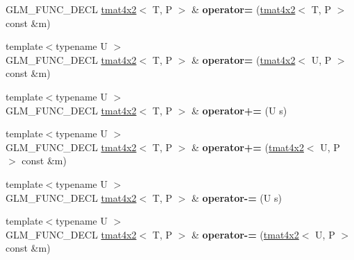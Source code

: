 \begin{DoxyCompactItemize}
\item 
G\+L\+M\+\_\+\+F\+U\+N\+C\+\_\+\+D\+E\+CL \hyperlink{structglm_1_1detail_1_1tmat4x2}{tmat4x2}$<$ T, P $>$ \& {\bfseries operator=} (\hyperlink{structglm_1_1detail_1_1tmat4x2}{tmat4x2}$<$ T, P $>$ const \&m)\hypertarget{structglm_1_1detail_1_1tmat4x2_a540bb35dcfe3e71b82c4abccca943cd2}{}\label{structglm_1_1detail_1_1tmat4x2_a540bb35dcfe3e71b82c4abccca943cd2}

\item 
{\footnotesize template$<$typename U $>$ }\\G\+L\+M\+\_\+\+F\+U\+N\+C\+\_\+\+D\+E\+CL \hyperlink{structglm_1_1detail_1_1tmat4x2}{tmat4x2}$<$ T, P $>$ \& {\bfseries operator=} (\hyperlink{structglm_1_1detail_1_1tmat4x2}{tmat4x2}$<$ U, P $>$ const \&m)\hypertarget{structglm_1_1detail_1_1tmat4x2_a520ecb4fc8ff7b87e517db74d07678a7}{}\label{structglm_1_1detail_1_1tmat4x2_a520ecb4fc8ff7b87e517db74d07678a7}

\item 
{\footnotesize template$<$typename U $>$ }\\G\+L\+M\+\_\+\+F\+U\+N\+C\+\_\+\+D\+E\+CL \hyperlink{structglm_1_1detail_1_1tmat4x2}{tmat4x2}$<$ T, P $>$ \& {\bfseries operator+=} (U s)\hypertarget{structglm_1_1detail_1_1tmat4x2_afc1384cd2981f135bf21be4f2405298d}{}\label{structglm_1_1detail_1_1tmat4x2_afc1384cd2981f135bf21be4f2405298d}

\item 
{\footnotesize template$<$typename U $>$ }\\G\+L\+M\+\_\+\+F\+U\+N\+C\+\_\+\+D\+E\+CL \hyperlink{structglm_1_1detail_1_1tmat4x2}{tmat4x2}$<$ T, P $>$ \& {\bfseries operator+=} (\hyperlink{structglm_1_1detail_1_1tmat4x2}{tmat4x2}$<$ U, P $>$ const \&m)\hypertarget{structglm_1_1detail_1_1tmat4x2_a65939b2c728dde98658056e9f1e68b2a}{}\label{structglm_1_1detail_1_1tmat4x2_a65939b2c728dde98658056e9f1e68b2a}

\item 
{\footnotesize template$<$typename U $>$ }\\G\+L\+M\+\_\+\+F\+U\+N\+C\+\_\+\+D\+E\+CL \hyperlink{structglm_1_1detail_1_1tmat4x2}{tmat4x2}$<$ T, P $>$ \& {\bfseries operator-\/=} (U s)\hypertarget{structglm_1_1detail_1_1tmat4x2_aa29ebe7a63b94a6313746b46e249bbab}{}\label{structglm_1_1detail_1_1tmat4x2_aa29ebe7a63b94a6313746b46e249bbab}

\item 
{\footnotesize template$<$typename U $>$ }\\G\+L\+M\+\_\+\+F\+U\+N\+C\+\_\+\+D\+E\+CL \hyperlink{structglm_1_1detail_1_1tmat4x2}{tmat4x2}$<$ T, P $>$ \& {\bfseries operator-\/=} (\hyperlink{structglm_1_1detail_1_1tmat4x2}{tmat4x2}$<$ U, P $>$ const \&m)\hypertarget{structglm_1_1detail_1_1tmat4x2_a1090317fd177133e27ad3aeeb38d931b}{}\label{structglm_1_1detail_1_1tmat4x2_a1090317fd177133e27ad3aeeb38d931b}


\end{DoxyCompactItemize}
